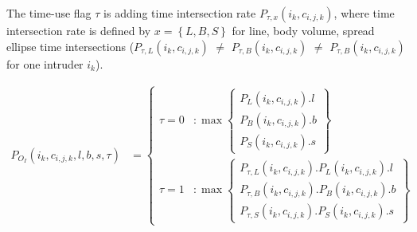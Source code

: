 The time-use flag $\tau$ is adding time intersection rate $P_{\tau,x}(i_k,c_{i,j,k})$, where time intersection rate is defined by $x=\left\{L,B,S\right\}$ for line, body volume, spread ellipse time intersections ($P_{\tau,L}(i_k,c_{i,j,k})$ $\neq$ $P_{\tau,B}(i_k,c_{i,j,k})$ $\neq$ $P_{\tau,B}(i_k,c_{i,j,k})$ for one intruder $i_k$).

\begin{equation}\label{eq:intruderInCellProbabilityOneIntruder}
    \begin{aligned}
        P_{O_I}(i_k,c_{i,j,k},l,b,s,\tau) & = \begin{cases}\tau=0&:\max\left\{\begin{aligned}P_L(i_k,c_{i,j,k}).l\\ P_B(i_k,c_{i,j,k}).b\\P_S(i_k,c_{i,j,k}).s\end{aligned}\right\}\\\tau=1&:\max\left\{\begin{aligned}P_{\tau,L}(i_k,c_{i,j,k}).P_L(i_k,c_{i,j,k}).l\\ P_{\tau,B}(i_k,c_{i,j,k}).P_B(i_k,c_{i,j,k}).b\\P_{\tau,S}(i_k,c_{i,j,k}).P_S(i_k,c_{i,j,k}).s\end{aligned}\right\}\end{cases} &\\
    \end{aligned}
\end{equation}



